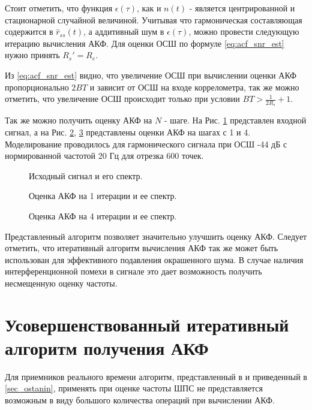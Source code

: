 Стоит отметить, что функция ${\epsilon(\tau)}$, как и ${n(t)}$ - является центрированной и
стационарной случайной величиной.
Учитывая что гармоническая составляющая содержится в ${\hat{r}_{ss}(t)}$, а аддитивный шум в ${\epsilon(\tau)}$, можно провести
следующую итерацию вычисления АКФ. Для оценки ОСШ по формуле \ref{eq:acf_snr_est} нужно принять ${R_s' = R_e}$.

Из \ref{eq:acf_snr_est} видно, что увеличение ОСШ при вычислении оценки АКФ пропорционально ${2BT}$ и зависит от
ОСШ на входе коррелометра, так же можно отметить, что увеличение ОСШ происходит только при условии ${BT > \frac{1}{2R_s} + 1}$.

Так же можно получить оценку АКФ на ${N}$ - шаге. На Рис. \ref{pic:acf_0_iter} представлен входной сигнал, а на
Рис. \ref{pic:acf_1_iter}, \ref{pic:acf_4_iter} представлены оценки АКФ на шагах с 1 и 4.
Моделирование проводилось для гармонического сигнала при ОСШ -44 дБ с нормированной частотой 20 Гц для
отрезка 600 точек.

\begin{figure}[h]
	\center{}
	\caption{Исходный сигнал и его спектр.}
	\label{pic:acf_0_iter}
\end{figure}

\begin{figure}[h]
	\center{}
	\caption{Оценка АКФ на 1 итерации и ее спектр.}
	\label{pic:acf_1_iter}
\end{figure}

\begin{figure}[h]
	\center{}
	\caption{Оценка АКФ на 4 итерации и ее спектр.}
	\label{pic:acf_4_iter}
\end{figure}

Представленный алгоритм позволяет значительно улучшить оценку АКФ. Следует отметить, что итеративный алгоритм вычисления АКФ так же
может быть использован для эффективного подавления окрашенного шума. В случае наличия интерференционной помехи в сигнале это дает
возможность получить несмещенную оценку частоты.

\section{Усовершенствованный итеративный алгоритм получения АКФ}
\label{sec_acf_fft}
Для приемников реального времени алгоритм, представленный в \cite{ostanin_akf} и приведенный в \ref{sec_ostanin}, применять при оценке 
частоты ШПС не представляется возможным в виду большого количества операций при вычислении АКФ.

